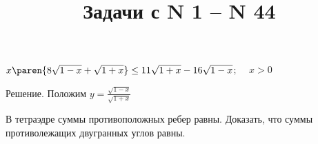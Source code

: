 \documentclass{article}
\title{Задачи  с N 1 -- N 44}
\author{}
\date{}
\begin{document}
\maketitle


\problem  %

$x \paren{8 \sqrt{1 - x} + \sqrt{1 + x}} \leq 11 \sqrt{1 + x} - 16 \sqrt{1 - x}$; $\quad x > 0$

Решение.
Положим $y = \frac{\sqrt{1 - x}}{\sqrt{1 + x}}$



\problem  %

В тетраэдре суммы противоположных ребер равны. Доказать, что суммы противолежащих двугранных углов равны.



\end{document}

